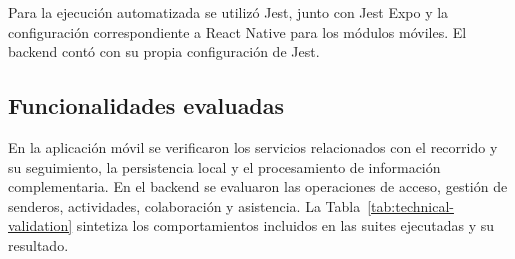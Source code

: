 Para la ejecución automatizada se utilizó Jest, junto con Jest Expo y la configuración correspondiente a React Native para los módulos móviles. El backend contó con su propia configuración de Jest.

\subsection{Funcionalidades evaluadas}

En la aplicación móvil se verificaron los servicios relacionados con el recorrido y su seguimiento, la persistencia local y el procesamiento de información complementaria. En el backend se evaluaron las operaciones de acceso, gestión de senderos, actividades, colaboración y asistencia. La Tabla~\ref{tab:technical-validation} sintetiza los comportamientos incluidos en las suites ejecutadas y su resultado.

